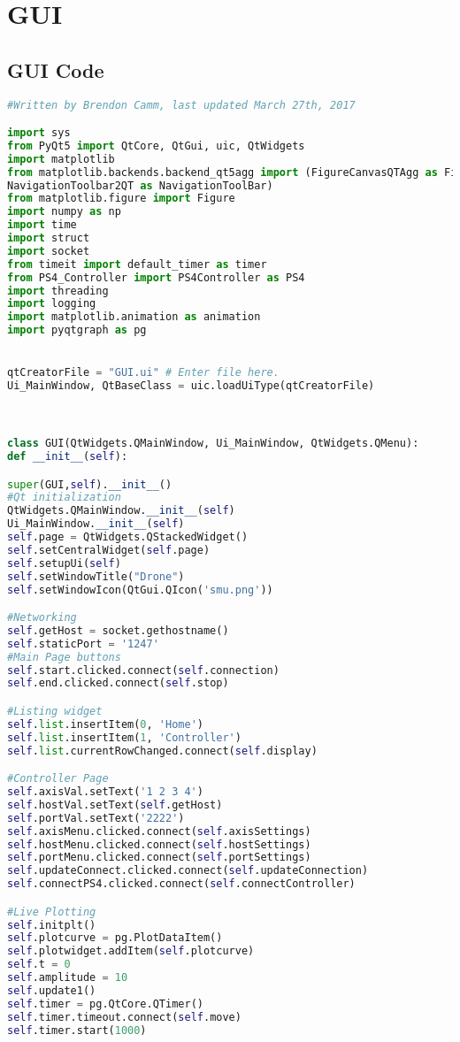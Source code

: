 \section{GUI}
\subsection{GUI Code}
\lstset{basicstyle=\tiny}
\begin{lstlisting}[language=Python,caption={GUI.py},label={lst:GUI.py}]
#Written by Brendon Camm, last updated March 27th, 2017

import sys
from PyQt5 import QtCore, QtGui, uic, QtWidgets
import matplotlib
from matplotlib.backends.backend_qt5agg import (FigureCanvasQTAgg as FigureCanvas,
NavigationToolbar2QT as NavigationToolBar)
from matplotlib.figure import Figure
import numpy as np
import time
import struct
import socket
from timeit import default_timer as timer
from PS4_Controller import PS4Controller as PS4
import threading
import logging
import matplotlib.animation as animation
import pyqtgraph as pg


qtCreatorFile = "GUI.ui" # Enter file here.
Ui_MainWindow, QtBaseClass = uic.loadUiType(qtCreatorFile)



class GUI(QtWidgets.QMainWindow, Ui_MainWindow, QtWidgets.QMenu):   
def __init__(self):

super(GUI,self).__init__()
#Qt initialization
QtWidgets.QMainWindow.__init__(self)
Ui_MainWindow.__init__(self)
self.page = QtWidgets.QStackedWidget()
self.setCentralWidget(self.page)
self.setupUi(self)
self.setWindowTitle("Drone")
self.setWindowIcon(QtGui.QIcon('smu.png'))

#Networking
self.getHost = socket.gethostname()
self.staticPort = '1247'
#Main Page buttons
self.start.clicked.connect(self.connection)
self.end.clicked.connect(self.stop)

#Listing widget
self.list.insertItem(0, 'Home')
self.list.insertItem(1, 'Controller')
self.list.currentRowChanged.connect(self.display)

#Controller Page
self.axisVal.setText('1 2 3 4')
self.hostVal.setText(self.getHost)
self.portVal.setText('2222')
self.axisMenu.clicked.connect(self.axisSettings)
self.hostMenu.clicked.connect(self.hostSettings)
self.portMenu.clicked.connect(self.portSettings)
self.updateConnect.clicked.connect(self.updateConnection)
self.connectPS4.clicked.connect(self.connectController)

#Live Plotting
self.initplt()
self.plotcurve = pg.PlotDataItem()
self.plotwidget.addItem(self.plotcurve)
self.t = 0
self.amplitude = 10
self.update1()
self.timer = pg.QtCore.QTimer()
self.timer.timeout.connect(self.move)
self.timer.start(1000)


\end{lstlisting}
